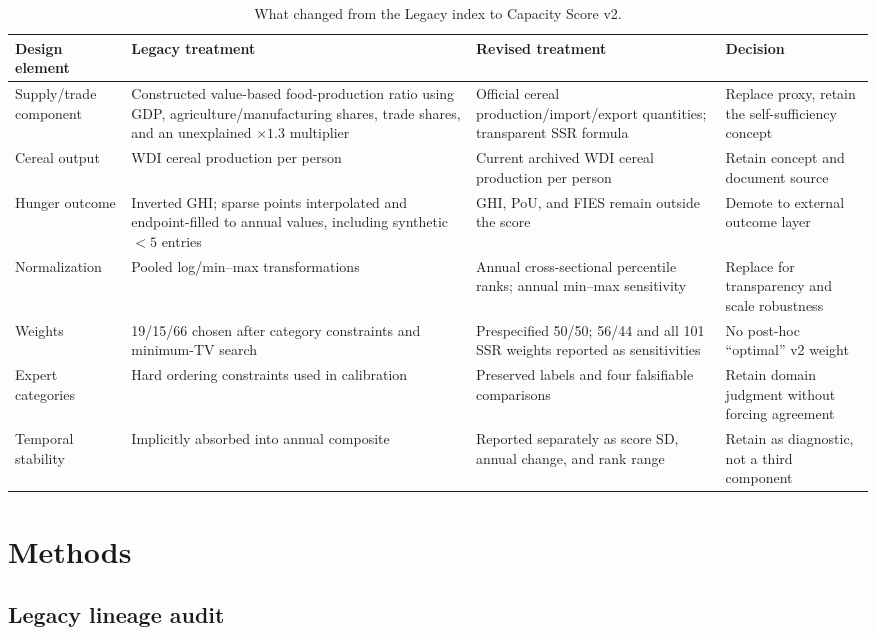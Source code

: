 \documentclass[11pt]{article}
\begin{document}
\begin{table}[H]
\centering
\caption{What changed from the Legacy index to Capacity Score v2.}
\label{tab:legacyv2}
\small
\begin{tabularx}{\textwidth}{L{2.35cm} Y Y L{2.15cm}}
\toprule
Design element & Legacy treatment & Revised treatment & Decision \\
\midrule
Supply/trade component & Constructed value-based food-production ratio using GDP, agriculture/manufacturing shares, trade shares, and an unexplained $\times1.3$ multiplier & Official cereal production/import/export quantities; transparent SSR formula & Replace proxy, retain the self-sufficiency concept \\
Cereal output & WDI cereal production per person & Current archived WDI cereal production per person & Retain concept and document source \\
Hunger outcome & Inverted GHI; sparse points interpolated and endpoint-filled to annual values, including synthetic $<5$ entries & GHI, PoU, and FIES remain outside the score & Demote to external outcome layer \\
Normalization & Pooled log/min--max transformations & Annual cross-sectional percentile ranks; annual min--max sensitivity & Replace for transparency and scale robustness \\
Weights & 19/15/66 chosen after category constraints and minimum-TV search & Prespecified 50/50; 56/44 and all 101 SSR weights reported as sensitivities & No post-hoc ``optimal'' v2 weight \\
Expert categories & Hard ordering constraints used in calibration & Preserved labels and four falsifiable comparisons & Retain domain judgment without forcing agreement \\
Temporal stability & Implicitly absorbed into annual composite & Reported separately as score SD, annual change, and rank range & Retain as diagnostic, not a third component \\
\bottomrule
\end{tabularx}
\end{table}

\section{Methods}

\subsection{Legacy lineage audit}
\end{document}
